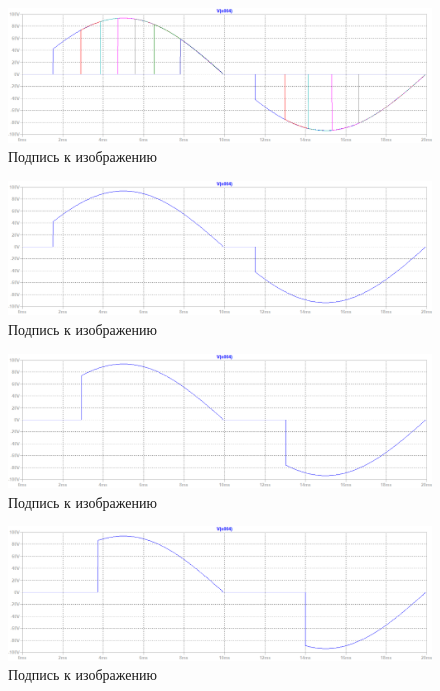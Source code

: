 \documentclass[a4paper, 12pt]{article}
\begin{document}
    \begin{figure}[H]
        \centering
        \includegraphics[scale=0.45]{R2-all.png}
        \captionsetup{skip=0pt}
        \caption{Подпись к изображению}
        \label{fig:R2-all}
    \end{figure}


    \begin{figure}[H]
        \centering
        \includegraphics[scale=0.45]{R2-10k.png}
        \captionsetup{skip=0pt}
        \caption{Подпись к изображению}
        \label{fig:R2-10k}
    \end{figure}
    \begin{figure}[H]
        \centering
        \includegraphics[scale=0.45]{R2-60k.png}
        \captionsetup{skip=0pt}
        \caption{Подпись к изображению}
        \label{fig:R2-60k}
    \end{figure}
    \begin{figure}[H]
        \centering
        \includegraphics[scale=0.45]{R2-100k.png}
        \captionsetup{skip=0pt}
        \caption{Подпись к изображению}
        \label{fig:R2-100k}
    \end{figure}
\end{document}
